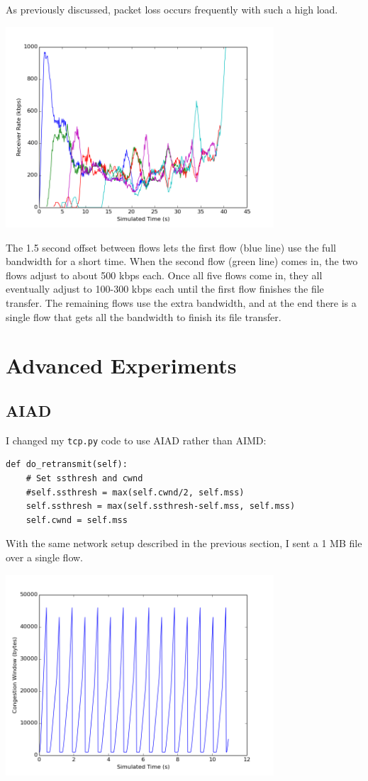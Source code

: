 \documentclass[11pt]{article}
\newcommand{\code}[1]{\texttt{#1}}
\begin{document}
As previously discussed, packet loss occurs frequently with such a high load.

\includegraphics[width=10cm]{../graphs/five_flow_receiver_rate.png}

The 1.5 second offset between flows lets the first flow (blue line) use the full bandwidth for a short time. When the second flow (green line) comes in, the two flows adjust to about 500 kbps each. Once all five flows come in, they all eventually adjust to 100-300 kbps each until the first flow finishes the file transfer. The remaining flows use the extra bandwidth, and at the end there is a single flow that gets all the bandwidth to finish its file transfer.

\section{Advanced Experiments}

\subsection{AIAD}
I changed my \code{tcp.py} code to use AIAD rather than AIMD:
\begin{lstlisting}
def do_retransmit(self):
	# Set ssthresh and cwnd
	#self.ssthresh = max(self.cwnd/2, self.mss)
	self.ssthresh = max(self.ssthresh-self.mss, self.mss)
	self.cwnd = self.mss
\end{lstlisting}
With the same network setup described in the previous section, I sent a 1 MB file over a single flow.

\includegraphics[width=10cm]{../graphs/aiad_cwnd.png}
\end{document}
